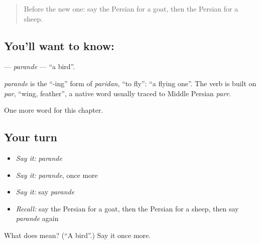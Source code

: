 \label{lesson:FA-C55-parande}



\begin{quote}
Before the new one: say the Persian for a goat, then the Persian for a sheep.
\end{quote}

\subsection*{You'll want to know: }
\textbf{} — \emph{parande} — \textquotedblleft{}a bird\textquotedblright{}.

\begin{cousinweb}
\emph{parande} is the \textquotedblleft{}-ing\textquotedblright{} form of \emph{paridan}, \textquotedblleft{}to fly\textquotedblright{}: \textquotedblleft{}a flying one\textquotedblright{}. The verb is built on \emph{par}, \textquotedblleft{}wing, feather\textquotedblright{}, a native word usually traced to Middle Persian \emph{parr}.
\end{cousinweb}

\begin{grammarlens}[title={What you've built}]
One more word for this chapter.
\end{grammarlens}

\subsection*{Your turn}
\begin{itemize}
\raggedright
  \item \emph{Say it:} \emph{parande}
  \item \emph{Say it:} \emph{parande}, once more
  \item \emph{Say it:} say \emph{parande}
  \item \emph{Recall:} say the Persian for a goat, then the Persian for a sheep, then say \emph{parande} again
\end{itemize}

\begin{tcolorbox}[breakable,colback=teal!4,colframe=teal!35!black,title={Before you move on}]
What does  mean? (\textquotedblleft{}A bird\textquotedblright{}.) Say it once more.
\end{tcolorbox}
